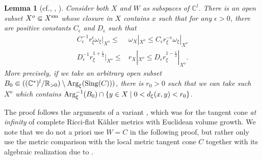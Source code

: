 \documentclass[12pt,a4paper]{amsart}
\newtheorem{Lem}[Thm]{Lemma}
\theoremstyle{remark}
\theoremstyle{definition}
\def\R{\mathbb{R}}
\def\C{\mathbb{C}}
\begin{document}
\begin{Lem}[{cf., \cite[Proposition 3.5]{SZ}, \cite[Lemma 5.3]{Zha24}}]
\label{SZlem}
Consider both $X$ and $W$ as subspaces of $\C^l$. 
There is an open subset 
$X^o\Subset X^{\rm sm}$ 
whose closure in $X$ 
contains $x$ 
such that for any $\epsilon>0$, 
there are positive constants $C_\epsilon$ and $D_\epsilon$ 
such that 
\begin{align}\label{met.comp}
C_\epsilon^{-1} 
r_\xi^{\epsilon}\omega_\xi|_{X^o}\le &\omega_X|_{X^o}\le 
C_\epsilon r_\xi^{-\epsilon}\omega_\xi|_{X^o}\\
\label{dist.comp}
D_\epsilon^{-1} 
r_\xi^{1+\frac{\epsilon}{2}}|_{X^o}\le 
&r_X|_{X^o}\le 
D_\epsilon r_\xi^{1-\frac{\epsilon}{2}}|_{X^o}. 
\end{align}
More precisely, 
if we take an arbitrary open subset 
$B_0\Subset((\C^*)^l/\R_{>0})\setminus 
{\rm Arg}_{\xi}({\rm Sing}(C)))$, there is $r_0>0$ such 
that 
we can take such $X^o$ which contains 
${\rm Arg}_{\xi}^{-1}(B_0)\cap  \{y\in X\mid 0<d_\xi(x,y)<r_0\}$. 
\end{Lem}

The proof follows the arguments of a variant 
\cite[Proposition 3.5]{SZ}, which was 
for the tangent cone {\it at infinity} of 
complete Ricci-flat K\"ahler metrics with Euclidean 
volume growth. We note that we do not a priori use 
$W=C$ in the following proof, 
but rather only use the metric comparison with the local metric tangent cone $C$ 
together with its algebraic realization due to \cite{DSII}. 
\end{document}
